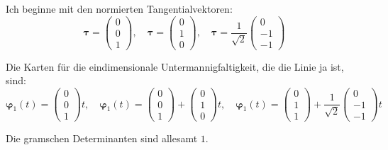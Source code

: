 \documentclass[11pt, ngerman]{article}
\renewcommand{\vec}[1]{\boldsymbol{#1}}
\begin{document}
Ich beginne mit den normierten Tangentialvektoren:
\[
	\vec \tau = \begin{pmatrix}
		0 \\ 0 \\ 1
	\end{pmatrix}
	,\quad
	\vec \tau = \begin{pmatrix}
		0 \\ 1 \\ 0
	\end{pmatrix}
	,\quad
	\vec \tau = \frac{1}{\sqrt{2}} \begin{pmatrix}
		0 \\ -1 \\ -1
	\end{pmatrix}
\]

Die Karten für die eindimensionale Untermannigfaltigkeit, die die Linie ja ist, sind:
\[
	\vec\varphi_1(t) = \begin{pmatrix}
		0 \\ 0 \\ 1
	\end{pmatrix} t
	,\quad
	\vec\varphi_1(t) = \begin{pmatrix}
		0 \\ 0 \\ 1
	\end{pmatrix} + \begin{pmatrix}
		0 \\ 1 \\ 0
	\end{pmatrix} t
	,\quad
	\vec\varphi_1(t) = \begin{pmatrix}
		0 \\ 1 \\ 1
	\end{pmatrix} + \frac{1}{\sqrt{2}} \begin{pmatrix}
		0 \\ -1 \\ -1
	\end{pmatrix} t
\]

Die gramschen Determinanten sind allesamt $1$.
\end{document}
